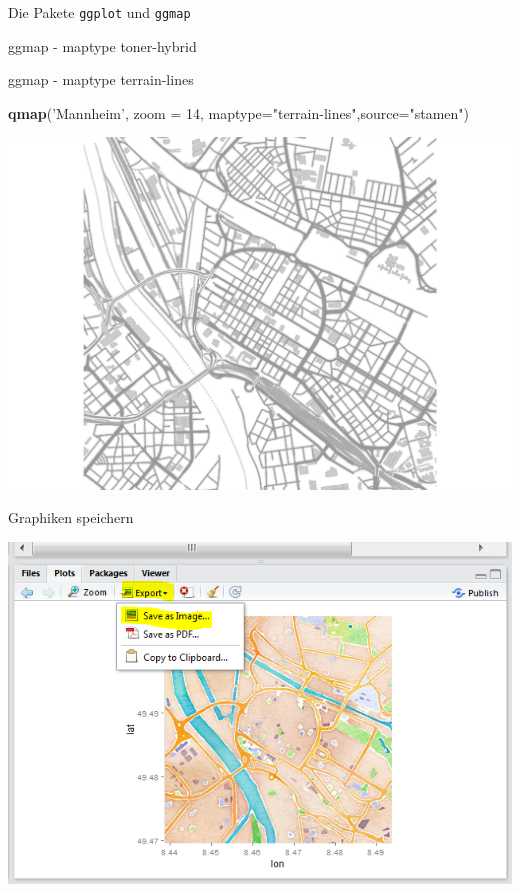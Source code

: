 \documentclass[ignorenonframetext,]{beamer}
\newenvironment{Shaded}{}{}
\newcommand{\KeywordTok}[1]{\textcolor[rgb]{0.00,0.44,0.13}{\textbf{{#1}}}}
\newcommand{\DataTypeTok}[1]{\textcolor[rgb]{0.56,0.13,0.00}{{#1}}}
\newcommand{\DecValTok}[1]{\textcolor[rgb]{0.25,0.63,0.44}{{#1}}}
\newcommand{\StringTok}[1]{\textcolor[rgb]{0.25,0.44,0.63}{{#1}}}
\newcommand{\NormalTok}[1]{{#1}}
\begin{document}
\begin{frame}[fragile]{Die Pakete \texttt{ggplot} und \texttt{ggmap}}
\begin{block}{ggmap - maptype toner-hybrid}
\end{block}

\begin{block}{ggmap - maptype terrain-lines}

\begin{Shaded}
\begin{Highlighting}[]
\KeywordTok{qmap}\NormalTok{(}\StringTok{'Mannheim'}\NormalTok{, }\DataTypeTok{zoom =} \DecValTok{14}\NormalTok{,}
 \DataTypeTok{maptype=}\StringTok{"terrain-lines"}\NormalTok{,}\DataTypeTok{source=}\StringTok{"stamen"}\NormalTok{)}
\end{Highlighting}
\end{Shaded}

\includegraphics{R_intern_files/figure-beamer/unnamed-chunk-270-1.pdf}

\end{block}

\begin{block}{Graphiken speichern}

\includegraphics{./tex2pdf.9796/eabdb869abc906d59fdf58e1d7099a3726da01e5.png}


\end{block}
\end{frame}
\end{document}
